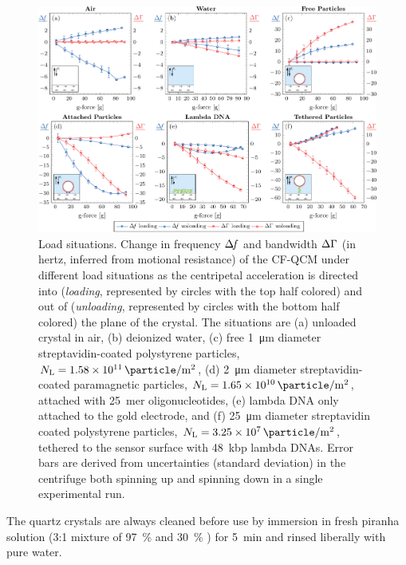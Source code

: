 \begin{figure}[ht]
  \centering
  \includegraphics[width=16cm,keepaspectratio]{qcm/figures/figure2.pdf}
  \caption{Load situations.
    Change in frequency $\Delta\!f$ and bandwidth $\Delta\Gamma$
    (in hertz, inferred from motional resistance) of
    the CF-QCM under different load situations as the centripetal acceleration
    is directed into (\textit{loading}, represented by circles with the top half
    colored) and out of (\textit{unloading}, represented by circles with the
    bottom half colored) the plane of the crystal.
    The situations are
    (a) unloaded crystal in air,
    (b) deionized water,
    (c) free \SI{1}{\micro\meter} diameter streptavidin-coated polystyrene
    particles, $N_\mathrm{L}=\SI{1.58e11}{\particle\per\meter\squared}$,
    (d) \SI{2}{\micro\meter} diameter streptavidin-coated paramagnetic
    particles, $N_\mathrm{L}=\SI{1.65e10}{\particle\per\meter\squared}$,
    attached with \SI{25}{mer} oligonucleotides,
    (e) lambda DNA only attached to the gold electrode, and
    (f) \SI{25}{\micro\meter} diameter streptavidin
    coated polystyrene particles,
    $N_\mathrm{L}=\SI{3.25e7}{\particle\per\meter\squared}$, tethered to the sensor surface with
    \SI{48}{kbp} lambda DNAs.  Error bars are derived from uncertainties
    (standard deviation) in the centrifuge both spinning up and spinning down in a single experimental run.}
  \label{fig:loadplot}
\end{figure}
The quartz crystals are always cleaned before use by immersion
in fresh piranha solution (3:1 mixture of \SI{97}{\percent}  and
\SI{30}{\percent} ) for \SI{5}{\minute} and rinsed liberally with
pure water.

